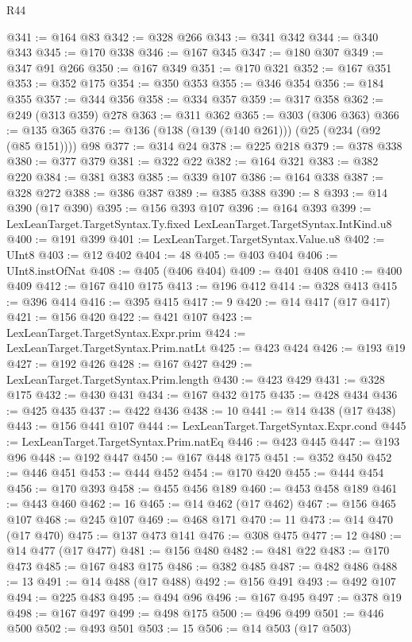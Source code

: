 \begin{lexlean}{R44}
\begin{coremodule}
@341 := @164 @83
@342 := @328 @266
@343 := @341 @342
@344 := @340 @343
@345 := @170 @338
@346 := @167 @345
@347 := @180 @307
@349 := @347 @91 @266
@350 := @167 @349
@351 := @170 @321
@352 := @167 @351
@353 := @352 @175
@354 := @350 @353
@355 := @346 @354
@356 := @184 @355
@357 := @344 @356
@358 := @334 @357
@359 := @317 @358
@362 := @249 (@313 @359) @278
@363 := @311 @362
@365 := @303 (@306 @363)
@366 := @135 @365
@376 := @136 (@138 (@139 (@140 @261))) (@25 (@234 (@92 (@85 @151)))) @98
@377 := @314 @24
@378 := @225 @218
@379 := @378 @338
@380 := @377 @379
@381 := @322 @22
@382 := @164 @321
@383 := @382 @220
@384 := @381 @383
@385 := @339 @107
@386 := @164 @338
@387 := @328 @272
@388 := @386 @387
@389 := @385 @388
@390 := 8
@393 := @14 @390 (@17 @390)
@395 := @156 @393 @107
@396 := @164 @393
@399 := LexLeanTarget.TargetSyntax.Ty.fixed LexLeanTarget.TargetSyntax.IntKind.u8
@400 := @191 @399
@401 := LexLeanTarget.TargetSyntax.Value.u8
@402 := UInt8
@403 := @12 @402
@404 := 48
@405 := @403 @404
@406 := UInt8.instOfNat
@408 := @405 (@406 @404)
@409 := @401 @408
@410 := @400 @409
@412 := @167 @410 @175
@413 := @196 @412
@414 := @328 @413
@415 := @396 @414
@416 := @395 @415
@417 := 9
@420 := @14 @417 (@17 @417)
@421 := @156 @420
@422 := @421 @107
@423 := LexLeanTarget.TargetSyntax.Expr.prim
@424 := LexLeanTarget.TargetSyntax.Prim.natLt
@425 := @423 @424
@426 := @193 @19
@427 := @192 @426
@428 := @167 @427
@429 := LexLeanTarget.TargetSyntax.Prim.length
@430 := @423 @429
@431 := @328 @175
@432 := @430 @431
@434 := @167 @432 @175
@435 := @428 @434
@436 := @425 @435
@437 := @422 @436
@438 := 10
@441 := @14 @438 (@17 @438)
@443 := @156 @441 @107
@444 := LexLeanTarget.TargetSyntax.Expr.cond
@445 := LexLeanTarget.TargetSyntax.Prim.natEq
@446 := @423 @445
@447 := @193 @96
@448 := @192 @447
@450 := @167 @448 @175
@451 := @352 @450
@452 := @446 @451
@453 := @444 @452
@454 := @170 @420
@455 := @444 @454
@456 := @170 @393
@458 := @455 @456 @189
@460 := @453 @458 @189
@461 := @443 @460
@462 := 16
@465 := @14 @462 (@17 @462)
@467 := @156 @465 @107
@468 := @245 @107
@469 := @468 @171
@470 := 11
@473 := @14 @470 (@17 @470)
@475 := @137 @473 @141
@476 := @308 @475
@477 := 12
@480 := @14 @477 (@17 @477)
@481 := @156 @480
@482 := @481 @22
@483 := @170 @473
@485 := @167 @483 @175
@486 := @382 @485
@487 := @482 @486
@488 := 13
@491 := @14 @488 (@17 @488)
@492 := @156 @491
@493 := @492 @107
@494 := @225 @483
@495 := @494 @96
@496 := @167 @495
@497 := @378 @19
@498 := @167 @497
@499 := @498 @175
@500 := @496 @499
@501 := @446 @500
@502 := @493 @501
@503 := 15
@506 := @14 @503 (@17 @503)

\end{coremodule}
\end{lexlean}
